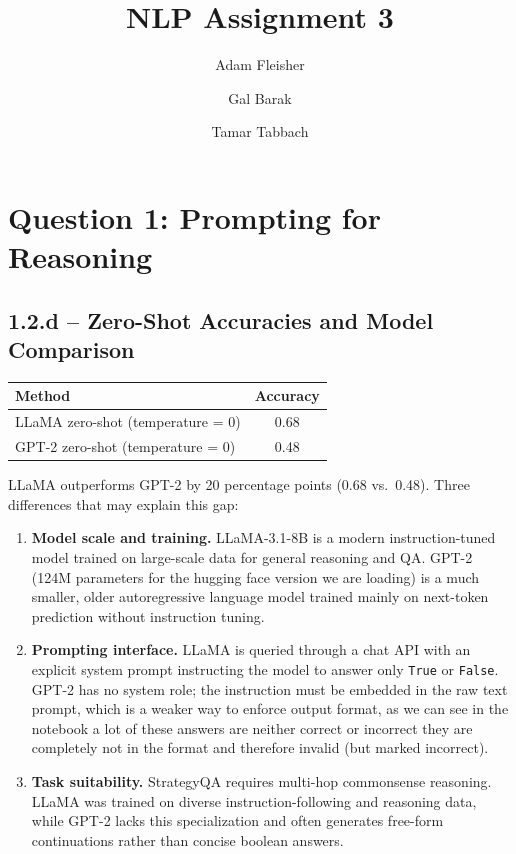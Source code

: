 \documentclass[11pt]{article}
\title{NLP Assignment 3}
\author{Adam Fleisher \and Gal Barak \and Tamar Tabbach}
\date{}
\begin{document}
\maketitle

\section*{Question 1: Prompting for Reasoning}

\subsection*{1.2.d -- Zero-Shot Accuracies and Model Comparison}

\begin{table}[h]
\centering
\begin{tabular}{lc}
\toprule
\textbf{Method} & \textbf{Accuracy} \\
\midrule
LLaMA zero-shot (temperature = 0) & 0.68 \\
GPT-2 zero-shot (temperature = 0) & 0.48 \\
\bottomrule
\end{tabular}
\end{table}

LLaMA outperforms GPT-2 by 20 percentage points (0.68 vs.\ 0.48). Three differences that may explain this gap:

\begin{enumerate}
    \item \textbf{Model scale and training.} LLaMA-3.1-8B is a modern instruction-tuned model trained on large-scale data for general reasoning and QA. GPT-2 (124M parameters for the hugging face version we are loading) is a much smaller, older autoregressive language model trained mainly on next-token prediction without instruction tuning.
    \item \textbf{Prompting interface.} LLaMA is queried through a chat API with an explicit system prompt instructing the model to answer only \texttt{True} or \texttt{False}. GPT-2 has no system role; the instruction must be embedded in the raw text prompt, which is a weaker way to enforce output format, as we can see in the notebook a lot of these answers are neither correct or incorrect they are completely not in the format and therefore invalid (but marked incorrect).
    \item \textbf{Task suitability.} StrategyQA requires multi-hop commonsense reasoning. LLaMA was trained on diverse instruction-following and reasoning data, while GPT-2 lacks this specialization and often generates free-form continuations rather than concise boolean answers.
\end{enumerate}
\end{document}
